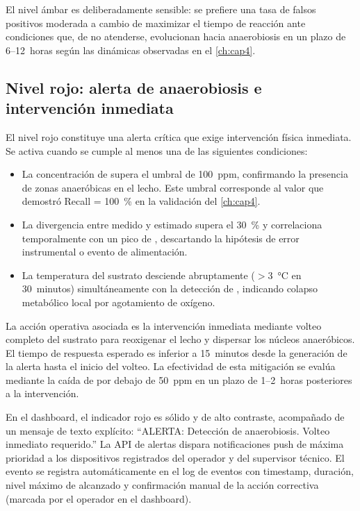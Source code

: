El nivel ámbar es deliberadamente sensible: se prefiere una tasa de falsos positivos moderada a cambio de maximizar el tiempo de reacción ante condiciones que, de no atenderse, evolucionan hacia anaerobiosis en un plazo de \num{6}--\num{12}~horas según las dinámicas observadas en el \cref{ch:cap4}.

\subsection{Nivel rojo: alerta de anaerobiosis e intervención inmediata}
\label{subsec:cap5_rojo}

El nivel rojo constituye una alerta crítica que exige intervención física inmediata. Se activa cuando se cumple al menos una de las siguientes condiciones:

\begin{itemize}
    \item La concentración de  supera el umbral de \num{100}~ppm, confirmando la presencia de zonas anaeróbicas en el lecho. Este umbral corresponde al valor que demostró Recall = \num{100}~\% en la validación del \cref{ch:cap4}.
    \item La divergencia entre  medido y estimado supera el \num{30}~\% y correlaciona temporalmente con un pico de , descartando la hipótesis de error instrumental o evento de alimentación.
    \item La temperatura del sustrato desciende abruptamente ($>$\num{3}~°C en \num{30}~minutos) simultáneamente con la detección de , indicando colapso metabólico local por agotamiento de oxígeno.
\end{itemize}

La acción operativa asociada es la intervención inmediata mediante volteo completo del sustrato para reoxigenar el lecho y dispersar los núcleos anaeróbicos. El tiempo de respuesta esperado es inferior a \num{15}~minutos desde la generación de la alerta hasta el inicio del volteo. La efectividad de esta mitigación se evalúa mediante la caída de  por debajo de \num{50}~ppm en un plazo de \num{1}--\num{2}~horas posteriores a la intervención.

En el dashboard, el indicador rojo es sólido y de alto contraste, acompañado de un mensaje de texto explícito: ``ALERTA: Detección de anaerobiosis. Volteo inmediato requerido.'' La API de alertas dispara notificaciones push de máxima prioridad a los dispositivos registrados del operador y del supervisor técnico. El evento se registra automáticamente en el log de eventos con timestamp, duración, nivel máximo de  alcanzado y confirmación manual de la acción correctiva (marcada por el operador en el dashboard).

